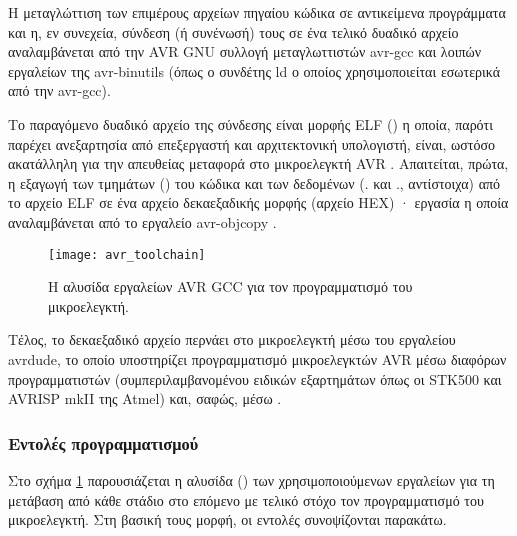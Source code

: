 Η μεταγλώττιση των επιμέρους αρχείων πηγαίου κώδικα σε αντικείμενα προγράμματα
και η, εν συνεχεία, σύνδεση (ή συνένωσή) τους σε ένα τελικό δυαδικό αρχείο
αναλαμβάνεται από την AVR GNU συλλογή μεταγλωττιστών avr-gcc και λοιπών
εργαλείων της avr-binutils (όπως ο συνδέτης ld ο οποίος χρησιμοποιείται
εσωτερικά από την avr-gcc).

Το παραγόμενο δυαδικό αρχείο της σύνδεσης είναι μορφής ELF () η οποία, παρότι παρέχει ανεξαρτησία από επεξεργαστή και
αρχιτεκτονική υπολογιστή, είναι, ωστόσο ακατάλληλη για την απευθείας μεταφορά
στο μικροελεγκτή AVR \parencites[47]{cruz97}[346]{avrlibc}. Απαιτείται, πρώτα, η
εξαγωγή των τμημάτων () του κώδικα και των δεδομένων (\@.
και \@., αντίστοιχα) από το αρχείο ELF σε ένα αρχείο δεκαεξαδικής
μορφής (αρχείο HEX) · εργασία η οποία αναλαμβάνεται από το εργαλείο avr-objcopy
\parencite[13,346]{avrlibc}.

\begin{figure}
    \caption{Η αλυσίδα εργαλείων AVR GCC για τον προγραμματισμό του
    μικροελεγκτή.\label{fig:avr:toolchain}}
    \begin{center}
    \texttt{[image: avr\_toolchain]}
    \end{center}
\end{figure}

Τέλος, το δεκαεξαδικό αρχείο περνάει στο μικροελεγκτή μέσω του εργαλείου
avrdude, το
οποίο υποστηρίζει προγραμματισμό μικροελεγκτών AVR μέσω διαφόρων προγραμματιστών
(συμπεριλαμβανομένου ειδικών εξαρτημάτων όπως οι STK500 και AVRISP mkII της
Atmel) και, σαφώς, μέσω  \parencites[15]{avrlibc}{avrdude}.


\subsubsection{Εντολές προγραμματισμού}

Στο σχήμα \ref{fig:avr:toolchain} παρουσιάζεται η αλυσίδα () των
χρησιμοποιούμενων εργαλείων για τη μετάβαση από κάθε στάδιο στο επόμενο με
τελικό στόχο τον προγραμματισμό του μικροελεγκτή. Στη βασική τους μορφή, οι
εντολές συνοψίζονται παρακάτω.

